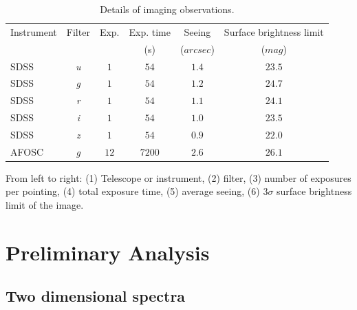 \documentclass[../thesis.tex]{subfiles}
\begin{document}
\begin{table}
    \centering
    \caption{Details of imaging observations.}
    \label{tab:obs_image}
    \begin{threeparttable}
    \begin{tabular}{lccccc}
    \hline
    \hline
    Instrument& Filter & Exp.& Exp. time & Seeing & Surface brightness limit \\
    & & & (s) & ($\si{arcsec}$)& ($\si{mag}$)\\   
    \hline
    SDSS &\emph{u}&$1$ &$54$ &$1.4$&$23.5$\\
    SDSS &\emph{g}&$1$ &$54$ &$1.2$&$24.7$\\
    SDSS &\emph{r}&$1$ &$54$ &$1.1$&$24.1$\\
    SDSS &\emph{i}&$1$ &$54$ &$1.0$&$23.5$\\
    SDSS &\emph{z}&$1$ &$54$ &$0.9$&$22.0$\\
    AFOSC&\emph{g}&$12$&$7200$&$2.6$&$26.1$\\
    \hline
    \end{tabular}
    \begin{tablenotes}
    \item From left to right: (1) Telescope or instrument, (2) filter, (3) number of exposures per pointing, (4) total exposure time, (5) average seeing, (6) $3\sigma$ surface brightness limit of the image.
    \end{tablenotes}
    \end{threeparttable}
\end{table}

\section{Preliminary Analysis}
\label{sec:analysis1_pap3}

\subsection{Two dimensional spectra}
\label{sec:2dspectra}
\end{document}

